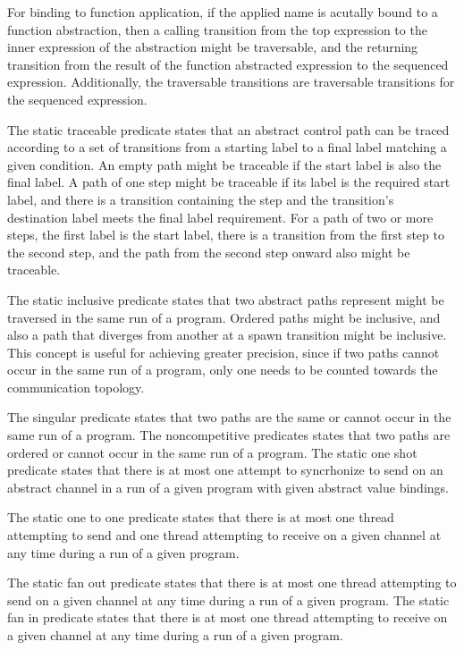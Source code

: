 \documentclass{article}
\begin{document}
For binding to function application, if the applied name is acutally bound to a function
abstraction, then a calling transition from the top expression to the inner expression of the
abstraction might be traversable, and the returning transition from the result of the function
abstracted expression to the sequenced expression.  Additionally, the traversable transitions
are traversable transitions for the sequenced expression. 


The static traceable predicate states that an abstract control path can be traced according to
a set of transitions from a starting label to a final label matching a given condition.  An
empty path might be traceable if the start label is also the final label.  A path of one step
might be traceable if its label is the required start label, and there is a transition
containing the step and the transition's destination label meets the final label requirement.
For a path of two or more steps, the first label is the start label, there is a transition from
the first step to the second step, and the path from the second step onward also might be
traceable.

The static inclusive predicate states that two abstract paths represent might be traversed in
the same run of a program. Ordered paths might be inclusive, and also a path that diverges
from another at a spawn transition might be inclusive.  This concept is useful for achieving
greater precision, since if two paths cannot occur in the same run of a program, only one needs
to be counted towards the communication topology. 

The singular predicate states that two paths are the same or cannot occur in the same run of a
program. The noncompetitive predicates states that two paths are ordered or cannot occur in the
same run of a program. The static one shot predicate states that there is at most one attempt
to syncrhonize to send on an abstract channel in a run of a given program with given abstract
value bindings.

The static one to one predicate states that there is at most one thread attempting to send and
one thread attempting to receive on a given channel at any time during a run of a given
program.

The static fan out predicate states that there is at most one thread attempting to send on a
given channel at any time during a run of a given program. The static fan in predicate states
that there is at most one thread attempting to receive on a given channel at any time during a
run of a given program.
\end{document}
